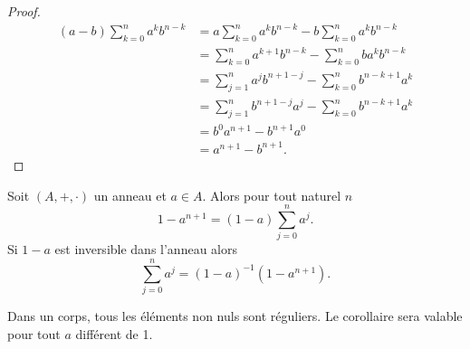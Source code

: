 \begin{proof}
  \begin{align}
    (a-b)\sum_{k=0}^n a^kb^{n-k} &= a \sum_{k=0}^n a^kb^{n-k} - b \sum_{k=0}^n a^kb^{n-k}\\
                                 &=\sum_{k=0}^n a^{k+1}b^{n-k} - \sum_{k=0}^n ba^kb^{n-k}\\
                                 &=\sum_{j=1}^n a^jb^{n+1-j} - \sum_{k=0}^n b^{n-k+1}a^k \\
                                 &=\sum_{j=1}^n b^{n+1-j}a^j - \sum_{k=0}^n b^{n-k+1}a^k \\
                                 &=b^0a^{n+1}-b^{n+1}a^0\\
                                 &=a^{n+1}-b^{n+1}.
  \end{align}
\end{proof}
\begin{corth}
  Soit \((A,+,\cdot)\) un anneau et \(a \in A\). Alors pour tout naturel \(n\)
  \begin{equation}
    1-a^{n+1}=(1-a)\sum_{j=0}^n a^j.
  \end{equation}
  Si \(1-a\) est inversible dans l'anneau alors
  \begin{equation}
    \sum_{j=0}^n a^j = (1-a)^{-1}(1-a^{n+1}).
  \end{equation}
\end{corth}
Dans un corps, tous les éléments non nuls sont réguliers. Le corollaire sera valable pour tout \(a\) différent de 1.

